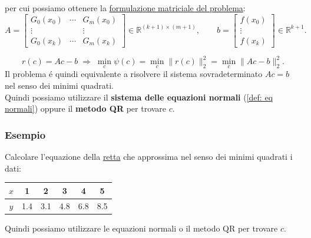 \documentclass[12pt,a4paper,]{report}
\begin{document}
per cui possiamo ottenere la \uline{formulazione matriciale del problema}:
\[
A =
\begin{bmatrix}
G_0(x_0) & \cdots & G_m(x_0) \\
\vdots  &        & \vdots  \\
G_0(x_k) & \cdots & G_m(x_k)
\end{bmatrix}
\in \mathbb{R}^{(k+1)\times(m+1)},
\qquad
b =
\begin{bmatrix}
f(x_0) \\
\vdots \\
f(x_k)
\end{bmatrix}
\in \mathbb{R}^{k+1}.
\]

\[
r(c) = Ac - b
\;\Longrightarrow\;
\min_{c}\psi(c)
= \min_{c}\|r(c)\|_2^2
= \min_{c}\|Ac - b\|_2^2.
\]
Il problema é quindi equivalente a risolvere il sistema sovradeterminato $Ac=b$ nel senso dei minimi quadrati.\\
Quindi possiamo utilizzare il \textbf{sistema delle equazioni normali} (\autoref{def: eq normali}) oppure il \textbf{metodo QR} per trovare $c$.

\subsubsection{Esempio}
Calcolare l'equazione della \uline{retta} che approssima nel senso dei minimi quadrati i dati:
\begin{center}
\begin{tabular}{c|ccccc}
    $x$ & 1 & 2 & 3 & 4 & 5\\
    \hline
    $y$ & 1.4 & 3.1 & 4.8 & 6.8 & 8.5
\end{tabular}
\end{center}

\noindent
Quindi possiamo utilizzare le equazioni normali o il metodo QR per trovare $c$.
\end{document}
